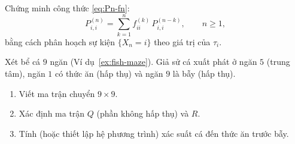 \begin{exercise}
Chứng minh công thức \eqref{eq:Pn-fn}:
\[
  P_{i,i}^{(n)} = \sum_{k=1}^{n} f_{ii}^{(k)}\, P_{i,i}^{(n-k)}, \qquad n \geq 1,
\]
bằng cách phân hoạch sự kiện $\{X_n = i\}$ theo giá trị của $\tau_i$.
\end{exercise}

\begin{exercise}
Xét bể cá $9$ ngăn (Ví dụ~\ref{ex:fish-maze}). Giả sử cá xuất phát ở ngăn $5$ (trung tâm),
ngăn $1$ có thức ăn (hấp thụ) và ngăn $9$ là bẫy (hấp thụ).
\begin{enumerate}[label=(\alph*)]
  \item Viết ma trận chuyển $9 \times 9$.
  \item Xác định ma trận $Q$ (phần không hấp thụ) và $R$.
  \item Tính (hoặc thiết lập hệ phương trình) xác suất cá đến thức ăn trước bẫy.
\end{enumerate}
\end{exercise}
